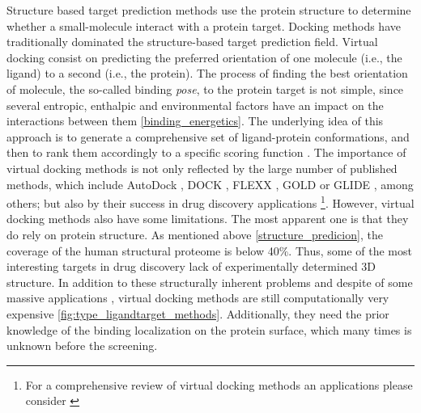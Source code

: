 \documentclass[12pt, b5paper,twoside]{tesi_upf}
\begin{document}
\par Structure based target prediction methods use the protein structure to determine whether a small-molecule interact with a protein target. Docking methods have traditionally dominated the structure-based target prediction field. Virtual docking consist on predicting the preferred orientation of one molecule (i.e., the ligand) to a second (i.e., the protein). The process of finding the best orientation of molecule, the so-called binding \textit{pose}, to the protein target is not simple, since several entropic, enthalpic and environmental factors have an impact on the interactions between them \ref{binding_energetics}. The underlying idea of this approach is to generate a comprehensive set of ligand-protein conformations, and then to rank them accordingly to a specific scoring function \cite{Alonso2006}. The importance of virtual docking methods is not only reflected by the large number of published methods, which include AutoDock \cite{Morris2009, Trott2010}, DOCK \cite{Ewing1997}, FLEXX \cite{Rarey1996}, GOLD \cite{Jones1997} or GLIDE \cite{Friesner2004}, among others; but also by their success in drug discovery applications \cite{Schames2004, Enyedy2001, Vangrevelinghe2003} \footnote{For a comprehensive review of virtual docking methods an applications please consider \cite{Kitchen2004}}. However, virtual docking methods also have some limitations. The most apparent one is that they do rely on protein structure. As mentioned above \ref{structure_predicion}, the coverage of the human structural proteome is below 40$\%$. Thus, some of the most interesting targets in drug discovery lack of experimentally determined 3D structure. In addition to these structurally inherent problems and despite of some massive applications \cite{Reardon2013}, virtual docking methods are still computationally very expensive \ref{fig:type_ligandtarget_methods}. Additionally, they need the prior knowledge of the binding localization on the protein surface, which many times is unknown before the screening. 
\end{document}
